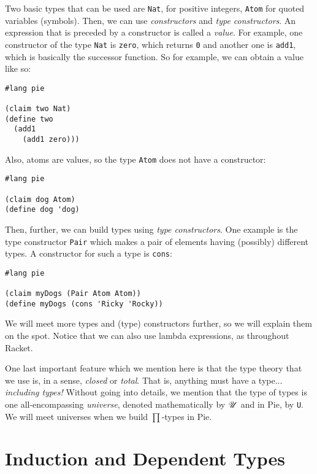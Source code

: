 
Two basic types that can be used are \texttt{Nat}, for positive integers,
\texttt{Atom} for quoted variables (symbols). Then, we can use
\emph{constructors} and \emph{type constructors}. An expression that is
preceded by a constructor is called a \emph{value}. For example, one constructor
of the type \texttt{Nat} is \texttt{zero}, which returns \texttt{0} and another
one is \texttt{add1}, which is basically the successor function. So for
example, we can obtain a value like so:
{
  \small
\begin{verbatim}
#lang pie

(claim two Nat)
(define two
  (add1
    (add1 zero)))
\end{verbatim}
}

Also, atoms are values, so the type \texttt{Atom} does not have a constructor:
{
  \small
\begin{verbatim}
#lang pie

(claim dog Atom)
(define dog 'dog)
\end{verbatim}
}

Then, further, we can build types using \emph{type constructors}. One example
is the type constructor \texttt{Pair} which makes a pair of elements having
(possibly) different types. A constructor for such a type is \texttt{cons}:
{
  \small
\begin{verbatim}
#lang pie

(claim myDogs (Pair Atom Atom))
(define myDogs (cons 'Ricky 'Rocky))
\end{verbatim}
}

We will meet more types and (type) constructors further, so we will explain
them on the spot. Notice that we can also use lambda expressions, as
throughout Racket.

One last important feature which we mention here is that the type theory that
we use is, in a sense, \emph{closed} or \emph{total}. That is, anything must
have a type... \emph{including types!} Without going into details, we mention
that the type of types is one all-encompassing \emph{universe}, denoted
mathematically by $ \mathscr{U} $ and in Pie, by \texttt{U}. We will meet universes
when we build $ \prod $-types in Pie.

\section{Induction and Dependent Types}
\label{sec:induction-pi}

